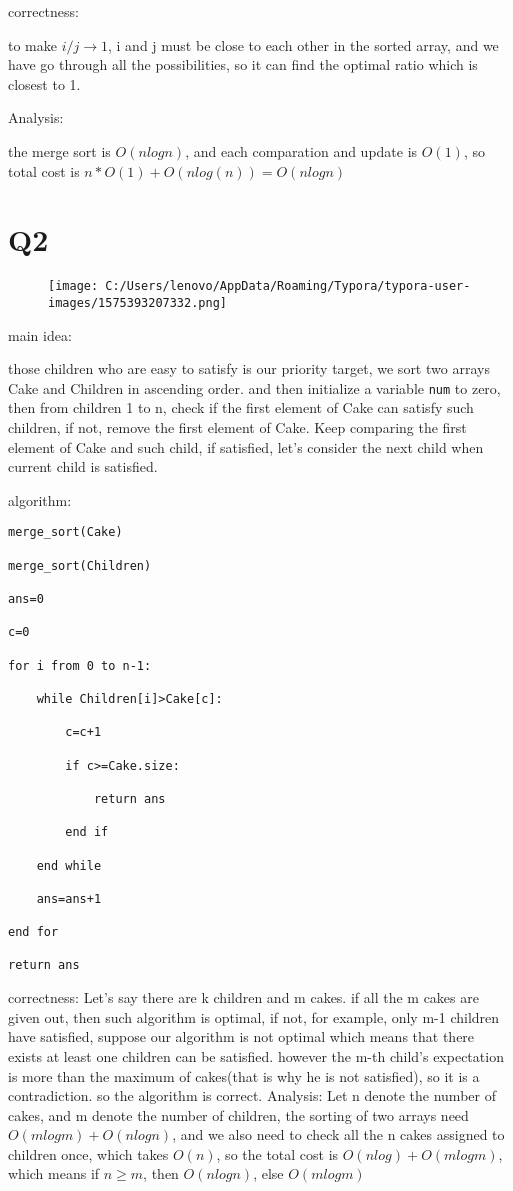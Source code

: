 \documentclass[]{article}
\begin{document}
correctness:

to make \(i/j\rightarrow1\), i and j must be close to each other in the
sorted array, and we have go through all the possibilities, so it can
find the optimal ratio which is closest to 1.

Analysis:

the merge sort is \(O(nlogn)\), and each comparation and update is
\(O(1)\), so total cost is \(n*O(1)+O(nlog(n))=O(nlog n)\)

\section{Q2}\label{header-n16}

\begin{figure}
\centering
\texttt{[image: C:/Users/lenovo/AppData/Roaming/Typora/typora-user-images/1575393207332.png]}
\caption{}
\end{figure}

main idea:

those children who are easy to satisfy is our priority target, we sort
two arrays Cake and Children in ascending order. and then initialize a
variable \texttt{num} to zero, then from children 1 to n, check if the
first element of Cake can satisfy such children, if not, remove the
first element of Cake. Keep comparing the first element of Cake and such
child, if satisfied, let's consider the next child when current child is
satisfied.

algorithm:

\begin{verbatim}
merge_sort(Cake)

merge_sort(Children)

ans=0

c=0

for i from 0 to n-1:

    while Children[i]>Cake[c]:

        c=c+1

        if c>=Cake.size:

            return ans

        end if 

    end while 

    ans=ans+1

end for 

return ans
\end{verbatim}

correctness: Let's say there are k children and m cakes. if all the m
cakes are given out, then such algorithm is optimal, if not, for
example, only m-1 children have satisfied, suppose our algorithm is not
optimal which means that there exists at least one children can be
satisfied. however the m-th child's expectation is more than the maximum
of cakes(that is why he is not satisfied), so it is a contradiction. so
the algorithm is correct. Analysis: Let n denote the number of cakes,
and m denote the number of children, the sorting of two arrays need
\(O(mlogm)+O(nlogn)\), and we also need to check all the n cakes
assigned to children once, which takes \(O(n)\), so the total cost is
\(O(nlog)+O(mlogm)\), which means if \(n\geq m\), then \(O(nlogn)\),
else \(O(m log m)\)
\end{document}
